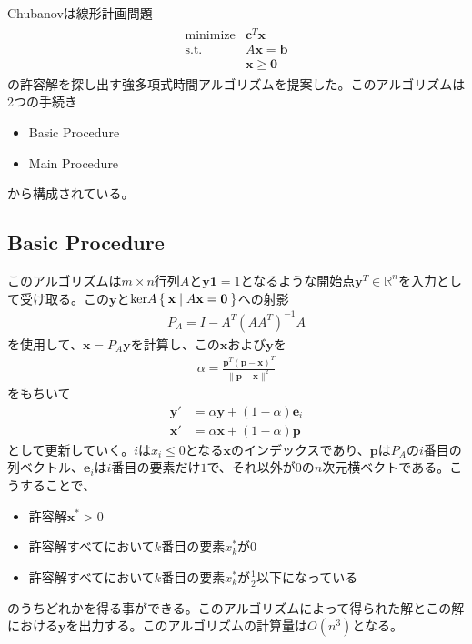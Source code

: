Chubanovは線形計画問題
\begin{align*}
  \begin{array}{ll}
    \text{minimize} & \mathbf{c}^T \mathbf{x} \\
    \text{s.t.}     & A \mathbf{x} = \mathbf{b} \\
                    & \mathbf{x} \geq \mathbf{0}
  \end{array}
\end{align*}
の許容解を探し出す強多項式時間アルゴリズムを提案した。このアルゴリズムは2つの手続き
\begin{itemize}
  \item Basic Procedure
  \item Main Procedure
\end{itemize}
から構成されている。

\subsection{Basic Procedure}
このアルゴリズムは$m \times n$行列$A$と$\mathbf{y} \mathbf{1} = 1$となるような開始点$\mathbf{y}^T \in \mathbb{R}^n$を入力として受け取る。この$\mathbf{y}$と$\mathrm{ker}A \Set{\mathbf{x} | A \mathbf{x} = \mathbf{0}}$への射影
\begin{align*}
  P_A = I - A^T (A A^T)^{-1} A
\end{align*}
を使用して、$\mathbf{x} = P_A \mathbf{y}$を計算し、この$\mathbf{x}$および$\mathbf{y}$を
\begin{align*}
  \alpha = \frac{\mathbf{p}^T (\mathbf{p} - \mathbf{x})^T}{\|\mathbf{p} - \mathbf{x}\|^2}
\end{align*}
をもちいて
\begin{align*}
  \mathbf{y}' & = \alpha \mathbf{y} + (1 - \alpha) \mathbf{e}_i \\
  \mathbf{x}' & = \alpha \mathbf{x} + (1 - \alpha) \mathbf{p}
\end{align*}
として更新していく。$i$は$x_i \leq 0$となる$\mathbf{x}$のインデックスであり、$\mathbf{p}$は$P_A$の$i$番目の列ベクトル、$\mathbf{e}_i$は$i$番目の要素だけ$1$で、それ以外が$0$の$n$次元横ベクトである。こうすることで、
\begin{itemize}
  \item 許容解$\mathbf{x}^* > 0$
  \item 許容解すべてにおいて$k$番目の要素$x_k^*$が$0$
  \item 許容解すべてにおいて$k$番目の要素$x_k^*$が$\frac{1}{2}$以下になっている
\end{itemize}
のうちどれかを得る事ができる。このアルゴリズムによって得られた解とこの解における$\mathbf{y}$を出力する。このアルゴリズムの計算量は$O(n^3)$となる。

